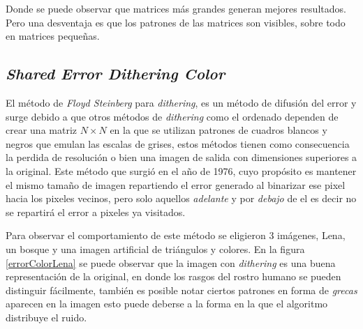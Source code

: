 \documentclass[conference]{IEEEtran}
\begin{document}
Donde se puede observar que matrices más grandes generan mejores resultados. Pero una desventaja es que los patrones de las matrices son visibles, sobre todo en matrices pequeñas.

\subsection{\textit{Shared Error Dithering Color}}
El método de \textit{Floyd Steinberg} para \textit{dithering}, es un método de difusión del error
y surge debido a que otros métodos de \textit{dithering} como el ordenado dependen de crear 
una matriz $N\times N$ en la que se utilizan patrones de cuadros blancos y negros que 
emulan las escalas de grises, estos métodos tienen como consecuencia la perdida 
de resolución o bien una imagen de salida con dimensiones superiores a la original.
Este método que surgió en el año de 1976, cuyo propósito es mantener el mismo tamaño de imagen repartiendo el error generado al binarizar ese pixel hacia los pixeles vecinos, pero solo aquellos
\textit{adelante} y por \textit{debajo} de el es decir no se repartirá el error a pixeles ya visitados.


Para observar el comportamiento de este método se eligieron 3 imágenes, Lena, un bosque y
una imagen artificial de triángulos y colores. En la figura \ref{errorColorLena}
se puede observar que la imagen con \textit{dithering} es una buena representación de la original, en donde  los rasgos del rostro humano se pueden distinguir fácilmente, también es posible notar ciertos patrones en forma de \textit{grecas} aparecen en la imagen esto puede deberse a la forma en la que el algoritmo distribuye el ruido.


\end{document}
